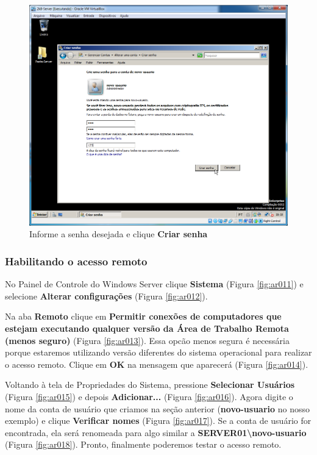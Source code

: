 \documentclass[10pt]{article}
\begin{document}
\begin{figure}[H]
    \centering
    \caption{Informe a senha desejada e clique \textbf{Criar senha}}
    \label{fig:ar008}
    \includegraphics[width=\linewidth]{images/acesso_remoto/ar008.png}
\end{figure}

\subsubsection{Habilitando o acesso remoto}
\par No Painel de Controle do Windows Server clique \textbf{Sistema} (Figura \ref{fig:ar011}) e selecione \textbf{Alterar configurações} (Figura \ref{fig:ar012}).
\par Na aba \textbf{Remoto} clique em \textbf{Permitir conexões de computadores que estejam executando qualquer versão da Área de Trabalho Remota (menos seguro)} (Figura \ref{fig:ar013}). Essa opcão menos segura é necessária porque estaremos utilizando versão diferentes do sistema operacional para realizar o acesso remoto. Clique em \textbf{OK} na mensagem que aparecerá (Figura \ref{fig:ar014}). 
\par Voltando à tela de Propriedades do Sistema, pressione \textbf{Selecionar Usuários} (Figura \ref{fig:ar015}) e depois \textbf{Adicionar...} (Figura \ref{fig:ar016}). Agora digite o nome da conta de usuário que criamos na seção anterior (\textbf{novo-usuario} no nosso exemplo) e clique \textbf{Verificar nomes} (Figura \ref{fig:ar017}). Se a conta de usuário for encontrada, ela será renomeada para algo similar a \textbf{SERVER01\textbackslash novo-usuario} (Figura \ref{fig:ar018}). Pronto, finalmente poderemos testar o acesso remoto. 
\end{document}
